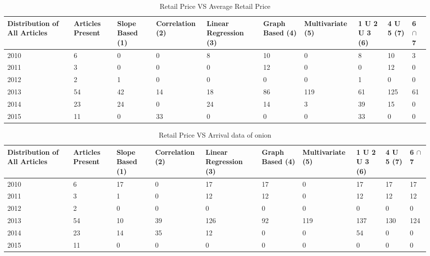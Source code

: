 	\begin{table}[]
	\centering
	\resizebox{\textwidth}{!}
	{\begin{tabular}{|l|l|l|l|l|l|l|l|l|l|}
	\hline
	Distribution of All Articles & Articles Present & Slope Based (1) & Correlation (2) & Linear Regression (3) & Graph Based (4) & Multivariate (5) & 1 U 2 U 3 (6) & 4 U 5 (7) & 6 $\cap$ 7 \\
	\hline
	2010 & 6  & 0  & 0  & 8  & 10 & 0   & 8  & 10  & 3  \\
	\hline
	2011 & 3  & 0  & 0  & 0  & 12 & 0   & 0  & 12  & 0  \\
	\hline
	2012 & 2  & 1  & 0  & 0  & 0  & 0   & 1  & 0   & 0  \\
	\hline
	2013 & 54 & 42 & 14 & 18 & 86 & 119 & 61 & 125 & 61 \\
	\hline
	2014 & 23 & 24 & 0  & 24 & 14 & 3   & 39 & 15  & 0  \\
	\hline
	2015 & 11 & 0  & 33 & 0  & 0  & 0   & 33 & 0   & 0  \\
	\hline
	\end{tabular}}	
	\caption{Retail Price VS Average Retail Price}
	\label{RetailVsAverage}
	\end{table}
	
	
	
	\begin{table}[]
	\centering
	\resizebox{\textwidth}{!}
	{\begin{tabular}{|l|l|l|l|l|l|l|l|l|l|}
	\hline
	Distribution of All Articles & Articles Present & Slope Based (1) & Correlation (2) & Linear Regression (3) & Graph Based (4) & Multivariate (5) & 1 U 2 U 3 (6) & 4 U 5 (7) & 6 $\cap$ 7  \\
	\hline
	2010 & 6  & 17 & 0  & 17  & 17 & 0   & 17  & 17  & 17  \\
	\hline
	2011 & 3  & 1  & 0  & 12  & 12 & 0   & 12  & 12  & 12  \\
	\hline
	2012 & 2  & 0  & 0  & 0   & 0  & 0   & 0   & 0   & 0   \\
	\hline
	2013 & 54 & 10 & 39 & 126 & 92 & 119 & 137 & 130 & 124 \\
	\hline
	2014 & 23 & 14 & 35 & 12  & 0  & 0   & 54  & 0   & 0   \\
	\hline
	2015 & 11 & 0  & 0  & 0   & 0  & 0   & 0   & 0   & 0  \\
	\hline
	\end{tabular}}	
	\caption{Retail Price VS Arrival data of onion}
	\label{RetailVsArrival}
	\end{table}

